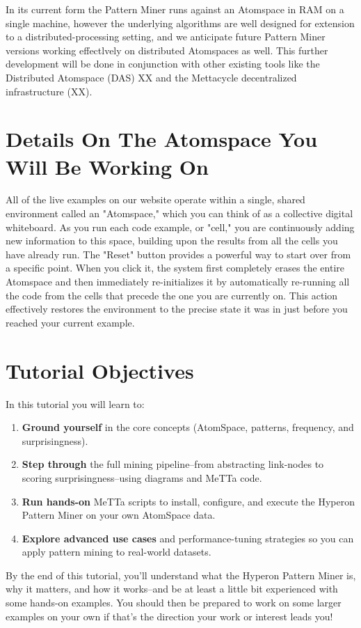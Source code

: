 \documentclass{article}
\begin{document}
In its current form the Pattern Miner runs against an Atomspace in RAM on a single machine, however the underlying algorithms are well designed for extension to a distributed-processing setting, and we anticipate future Pattern Miner versions working effectlvely on distributed Atomspaces as well.   This further development will be done in conjunction with other existing tools like the Distributed Atomspace (DAS) XX and the Mettacycle decentralized infrastructure (XX).

\section{Details On The Atomspace You Will Be Working On}

All of the live examples on our website operate within a single, shared environment called an "Atomspace," which you can think of as a collective digital whiteboard. As you run each code example, or "cell," you are continuously adding new information to this space, building upon the results from all the cells you have already run. The "Reset" button provides a powerful way to start over from a specific point. When you click it, the system first completely erases the entire Atomspace and then immediately re-initializes it by automatically re-running all the code from the cells that precede the one you are currently on. This action effectively restores the environment to the precise state it was in just before you reached your current example.

\section{Tutorial Objectives}

In this tutorial you will learn to:

\begin{enumerate}
  \item \textbf{Ground yourself} in the core concepts (AtomSpace, patterns, frequency, and surprisingness).
  \item \textbf{Step through} the full mining pipeline--from abstracting link-nodes to scoring surprisingness--using diagrams and MeTTa code.
  \item \textbf{Run hands-on} MeTTa scripts to install, configure, and execute the Hyperon Pattern Miner on your own AtomSpace data.
  \item \textbf{Explore advanced use cases} and performance-tuning strategies so you can apply pattern mining to real-world datasets.
\end{enumerate}

By the end of this tutorial, you'll understand what the Hyperon Pattern Miner is, why it matters, and how it works--and be at least a little bit experienced with some hands-on examples.   You should then be prepared to work on some larger examples on your own if that's the direction your work or interest leads you!
\end{document}
